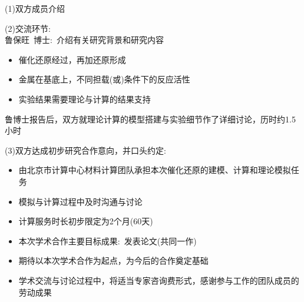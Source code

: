 (1)双方成员介绍

(2)交流环节:\\
{鲁保旺~博士}:~介绍有关研究背景和研究内容
\begin{itemize}
	\item {}催化还原经过，再加还原形成
	\item 金属在基底上，不同担载(或)条件下的反应活性
	\item 实验结果需要理论与计算的结果支持
\end{itemize}
鲁博士报告后，双方就理论计算的模型搭建与实验细节作了详细讨论，历时约1.5小时

(3)双方达成初步研究合作意向，并口头约定:
\begin{itemize}
	\item 由北京市计算中心材料计算团队承担本次催化还原的建模、计算和理论模拟任务
	\item 模拟与计算过程中及时沟通与讨论
	\item 计算服务时长初步限定为2个月(60天)
	\item 本次学术合作主要目标成果:~发表论文(共同一作)
	\item 期待以本次学术合作为起点，为今后的合作奠定基础
	\item 学术交流与讨论过程中，将适当专家咨询费形式，感谢参与工作的团队成员的劳动成果
\end{itemize}
